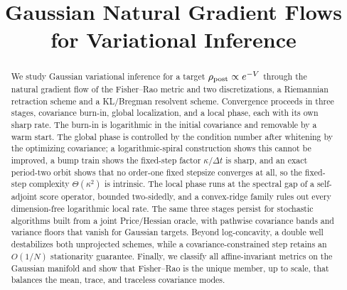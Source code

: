 

\title{Gaussian Natural Gradient Flows for Variational Inference}
\author{}
\date{}


\maketitle

\begin{abstract}
We study Gaussian variational inference for a target
$\rho_{\mathrm{post}}\propto e^{-V}$ through the natural gradient flow of the
Fisher--Rao metric and two discretizations, a Riemannian retraction
scheme and a KL/Bregman resolvent scheme. Convergence proceeds in three
stages, covariance burn-in, global localization, and a local phase,
each with its own sharp rate. The
burn-in is logarithmic in the initial covariance and removable by a warm
start. The global phase is controlled by the condition number after
whitening by the optimizing covariance; a logarithmic-spiral construction
shows this cannot be improved, a bump train shows the fixed-step
factor $\kappa/\Delta t$ is sharp, and an exact period-two orbit shows that no
order-one fixed stepsize converges at all, so the fixed-step complexity
$\Theta(\kappa^2)$ is intrinsic. The local phase runs at the spectral gap of
a self-adjoint score operator, bounded two-sidedly, and a
convex-ridge family rules out every dimension-free logarithmic local rate. The
same three stages persist for stochastic algorithms built from a joint
Price/Hessian oracle, with pathwise covariance bands and variance
floors that vanish for Gaussian targets. Beyond log-concavity, a double well
destabilizes both unprojected schemes, while a covariance-constrained step
retains an $O(1/N)$ stationarity guarantee. Finally, we classify all
affine-invariant metrics on the Gaussian manifold and show that Fisher--Rao is
the unique member, up to scale, that balances the mean, trace, and traceless
covariance modes.
\end{abstract}

